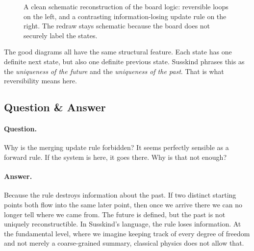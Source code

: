 \begin{figure}[h]
\centering
{}%
\caption{A clean schematic reconstruction of the board logic: reversible loops on the left, and a contrasting information-losing update rule on the right. The redraw stays schematic because the board does not securely label the states.}
\end{figure}

The good diagrams all have the same structural feature. Each state has one definite next state, but also one definite previous state. Susskind phrases this as the \emph{uniqueness of the future} and the \emph{uniqueness of the past}. That is what reversibility means here.

\subsection{Question \& Answer}

\paragraph{Question.} Why is the merging update rule forbidden? It seems perfectly sensible as a forward rule. If the system is here, it goes there. Why is that not enough?

\paragraph{Answer.} Because the rule destroys information about the past. If two distinct starting points both flow into the same later point, then once we arrive there we can no longer tell where we came from. The future is defined, but the past is not uniquely reconstructible. In Susskind's language, the rule loses information. At the fundamental level, where we imagine keeping track of every degree of freedom and not merely a coarse-grained summary, classical physics does not allow that.

